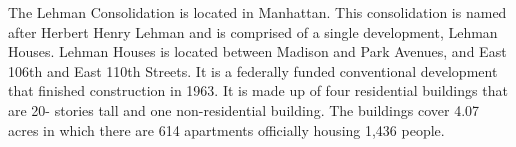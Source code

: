 The Lehman Consolidation is located in Manhattan. This consolidation is named after Herbert Henry Lehman and is comprised of a single development, Lehman Houses. Lehman Houses is located between Madison and Park Avenues, and East 106th and East 110th Streets. It is a federally funded conventional development that finished construction in 1963. It is made up of four residential buildings that are 20- stories tall and one non-residential building. The buildings cover 4.07 acres in which there are 614 apartments officially housing 1,436 people.